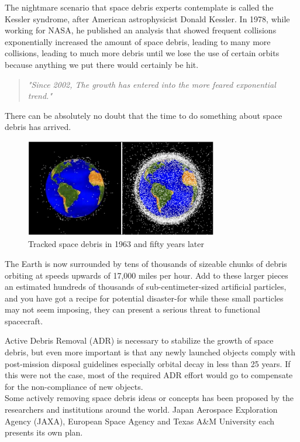 The nightmare scenario that space debris experts contemplate is called the Kessler syndrome, after American astrophysicist Donald Kessler. In 1978, while working for NASA, he published an analysis\cite{kessler1978collision} that showed frequent collisions exponentially increased the amount of space debris, leading to many more collisions, leading to much more debris until we lose the use of certain orbits because anything we put there would certainly be hit.

\begin{quote}
\em{"Since 2002, The growth has entered into the more feared exponential trend."}
\end{quote}
There can be absolutely no doubt that the time to do something about space debris has arrived.

\begin{figure}[ht]
\centering
\includegraphics[width=0.75\textwidth]{fig/motivation/TrackedSpaceDebris}
\caption{Tracked space debris in 1963 and fifty years later\cite{Garbage}}
\label{moti-TrackedSpaceDebris}
\end{figure}

The Earth is now surrounded by tens of thousands of sizeable chunks of debris orbiting at speeds upwards of 17,000 miles per hour. Add to these larger pieces an estimated hundreds of thousands of sub-centimeter-sized artificial particles, and you have got a recipe for potential disaster-for while these small particles may not seem imposing, they can present a serious threat to functional spacecraft.


Active Debris Removal (ADR) is necessary to stabilize the growth of space debris, but even more important is that any newly launched objects comply with post-mission disposal guidelines especially orbital decay in less than 25 years. If this were not the case, most of the required ADR effort would go to compensate for the non-compliance of new objects.\\

Some actively removing space debris ideas or concepts has been proposed by the researchers and institutions around the world. Japan Aerospace Exploration Agency (JAXA), European Space Agency and Texas A\&M University each presents its own plan.

\newpage

